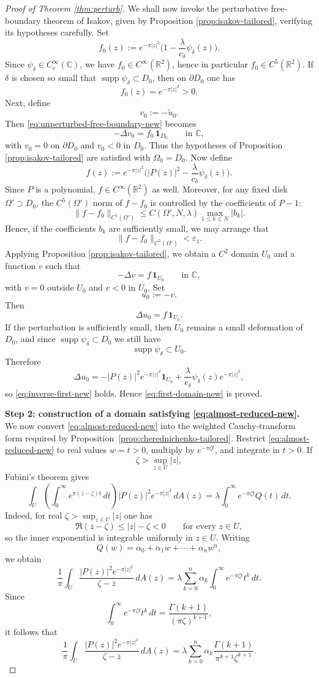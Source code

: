 \documentclass[a4paper,11pt,reqno]{amsart}
\numberwithin{equation}{section}
\theoremstyle{plain} %
\theoremstyle{definition} %
\theoremstyle{remark}
\DeclareMathOperator{\supp}{supp}
\newcommand{\R}{\mathbb{R}}
\newcommand{\C}{\mathbb{C}}
\begin{document}
\begin{proof}[Proof of Theorem \ref{thm:perturb}]
We shall now invoke the perturbative free-boundary theorem of Isakov, given by Proposition \ref{prop:isakov-tailored}, verifying its hypotheses carefully. Set
\[
f_0(z):=e^{-\pi|z|^2}\Big(1-\frac{\lambda}{c_\delta}\psi_\delta(z)\Big).
\]
Since $\psi_\delta\in C_c^\infty(\C)$, we have $f_0\in C^\infty(\R^2)$, hence in particular $f_0\in C^5(\R^2)$. If $\delta$ is chosen so small that $\supp\psi_\delta\subset D_0$, then on $\partial D_0$ one has
\[
f_0(z)=e^{-\pi|z|^2}>0.
\]
Next, define
\[
v_0:=-\widetilde u_0.
\]
Then \eqref{eq:unperturbed-free-boundary-new} becomes
\[
-\Delta v_0=f_0\,\mathbf{1}_{D_0}
\qquad \text{in }\C,
\]
with \(v_0=0\) on \(\partial D_0\) and \(v_0<0\) in \(D_0\). Thus the hypotheses
of Proposition \ref{prop:isakov-tailored} are satisfied with \(\Omega_0=D_0\).
Now define
\[
f(z):=e^{-\pi|z|^2}\Big(|P(z)|^2-\frac{\lambda}{c_\delta}\psi_\delta(z)\Big).
\]
Since $P$ is a polynomial, $f\in C^\infty(\R^2)$ as well. Moreover, for any fixed disk $\Omega'\supset D_0$, the $C^5(\Omega')$ norm of $f-f_0$ is controlled by the coefficients of $P-1$:
\[
\|f-f_0\|_{C^5(\Omega')}\le C(\Omega',N,\lambda)\max_{1\le k\le N}|b_k|.
\]
Hence, if the coefficients $b_k$ are sufficiently small, we may arrange that
\[
\|f-f_0\|_{C^5(\Omega')}<\varepsilon_1.
\]
Applying Proposition \ref{prop:isakov-tailored}, we obtain a $C^2$ domain $U_0$ and a function $v$ such that
\[
-\Delta v=f\,\mathbf{1}_{U_0}
\qquad \text{in }\C,
\]
with $v=0$ outside $U_0$ and $v<0$ in $U_0$. Set
\[
u_0:=-v.
\]
Then
\[
\Delta u_0=f\,\mathbf{1}_{U_0}.
\]
If the perturbation is sufficiently small, then $U_0$ remains a small deformation of $D_0$, and since $\supp\psi_\delta\subset D_0$ we still have
\[
\supp\psi_\delta\subset U_0.
\]
Therefore
\[
\Delta u_0
=
-|P(z)|^2e^{-\pi|z|^2}\mathbf{1}_{U_0}
+\frac{\lambda}{c_\delta}\psi_\delta(z)e^{-\pi|z|^2},
\]
so \eqref{eq:inverse-first-new} holds. Hence \eqref{eq:first-domain-new} is proved.

\medskip
\noindent\textbf{Step 2: construction of a domain satisfying \eqref{eq:almost-reduced-new}.}
We now convert \eqref{eq:almost-reduced-new} into the weighted Cauchy-transform
form required by Proposition~\ref{prop:cherednichenko-tailored}. Restrict
\eqref{eq:almost-reduced-new} to real values \(w=t>0\), multiply by
\(e^{-\pi \zeta t}\), and integrate in \(t>0\). If
\[
\zeta>\sup_{z\in U}|z|,
\]
Fubini's theorem gives
\[
\int_U \left(\int_0^\infty e^{\pi(\overline z-\zeta)t}\,dt\right)|P(z)|^2e^{-\pi|z|^2}\,dA(z)
=
\lambda\int_0^\infty e^{-\pi\zeta t}Q(t)\,dt.
\]
Indeed, for real \(\zeta>\sup_{z\in U}|z|\) one has
\[
\Re(\overline z-\zeta)\le |z|-\zeta<0
\qquad \text{for every } z\in U,
\]
so the inner exponential is integrable uniformly in \(z\in U\).
Writing
\[
Q(w)=\alpha_0+\alpha_1 w+\cdots+\alpha_n w^n,
\]
we obtain
\[
\frac{1}{\pi}\int_U \frac{|P(z)|^2e^{-\pi|z|^2}}{\zeta-\overline z}\,dA(z)
=
\lambda \sum_{k=0}^n \alpha_k \int_0^\infty e^{-\pi \zeta t} t^k\,dt.
\]
Since
\[
\int_0^\infty e^{-\pi \zeta t} t^k\,dt
=
\frac{\Gamma(k+1)}{(\pi \zeta)^{k+1}},
\]
it follows that
\[
\frac{1}{\pi}\int_U \frac{|P(z)|^2e^{-\pi|z|^2}}{\zeta-\overline z}\,dA(z)
=
\lambda \sum_{k=0}^n \alpha_k \frac{\Gamma(k+1)}{\pi^{k+1}\zeta^{k+1}}.
\]


\end{proof}
\end{document}
